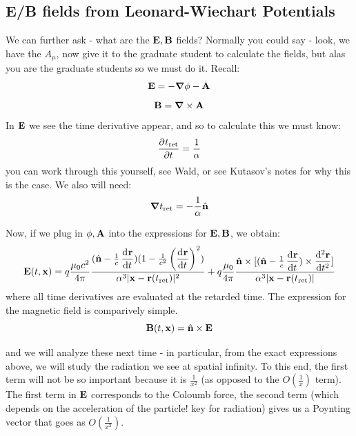 \subsection{E/B fields from Leonard-Wiechart Potentials}

We can further ask - what are the $\mathbf{E}, \mathbf{B}$ fields? Normally you could say - look, we have the $A_\mu$, now give it to the graduate student to calculate the fields, but alas you are the graduate students so we must do it. Recall:
\begin{equation}
    \v{E} = -\nabla \phi - \dot{\v{A}}
\end{equation}
\begin{equation}
    \v{B} = \nabla \times \v{A}
\end{equation}
In $\mathbf{E}$ we see the time derivative appear, and so to calculate this we must know:
\begin{equation}
    \dpd{t_{\text{ret}}}{t} = \frac{1}{\alpha}
\end{equation}
you can work through this yourself, see Wald, or see Kutasov's notes for why this is the case. We also will need:
\begin{equation}
    \nabla t_{\text{ret}} = -\frac{1}{\alpha}\hat{\v{n}}
\end{equation}

Now, if we plug in $\phi, \mathbf{A}$ into the expressions for $\mathbf{E}, \mathbf{B}$, we obtain:
\begin{equation}
    \v{E}(t, \v{x}) = q\frac{\mu_0 c^2}{4\pi}\frac{(\hat{\v{n}} - \frac{1}{c}\dod{\v{r}}{t})(1 - \frac{1}{c^2}\left(\dod{\v{r}}{t}\right)^2)}{\alpha^3\abs{\v{x} - \v{r}(t_{\text{ret}})}^2} + q\frac{\mu_0}{4\pi}\frac{\hat{\v{n}} \times [(\hat{\v{n}} - \frac{1}{c}\dod{\v{r}}{t})\times \dod[2]{\v{r}}{t}]}{\alpha^3\abs{\v{x} - \v{r}(t_{\text{ret}})}}
\end{equation}
where all time derivatives are evaluated at the retarded time. The expression for the magnetic field is comparively simple.
\begin{equation}
    \mathbf{B}(t, \mathbf{x}) = \hat{\mathbf{n}} \times \mathbf{E}
\end{equation}

and we will analyze these next time - in particular, from the exact expressions above, we will study the radiation we see at spatial infinity. To this end, the first term will not be so important because it is $\frac{1}{x^2}$ (as opposed to the $O(\frac{1}{x})$ term). The first term in $\mathbf{E}$ corresponds to the Coloumb force, the second term (which depends on the acceleration of the particle! key for radiation) gives us a Poynting vector that goes as $O(\frac{1}{x^2})$.